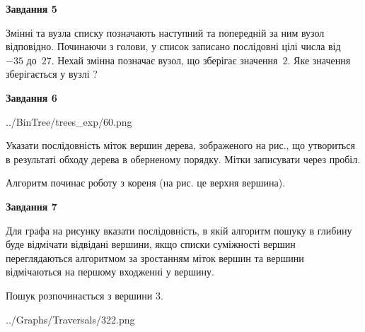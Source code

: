 \documentclass[12pt, ukrainian]{article}
\begin{document}
{\begin {large}
{\begin {center}\textbf{Завдання 5}\end {center}}\par
Змінні  та  вузла списку позначають наступний та попередній за ним вузол відповідно. Починаючи з голови, у список записано послідовні цілі числа від~$-35$ до~$27$. Нехай змінна  позначає вузол, що зберігає значення~$2$.
Яке значення зберігається у вузлі  ?\par
\newpage

{\begin {center}\textbf{Завдання 6}\end {center}}\par

\begin{center}
	{../BinTree/trees_exp/60.png}
\end{center}
Указати послідовність міток вершин дерева, зображеного на рис., що утвориться в результаті обходу дерева в оберненому порядку. Мітки записувати через пробіл.\par Алгоритм починає роботу з кореня (на рис. це верхня вершина).\par
\newpage

{\begin {center}\textbf{Завдання 7}\end {center}}\par
Для графа на рисунку вказати послідовність, в якій алгоритм пошуку в глибину буде відмічати відвідані вершини, якщо списки суміжності вершин переглядаються алгоритмом за зростанням міток вершин та вершини відмічаються на першому вход\-женні у вершину.\par
Пошук розпочинається з вершини 3.\par

\begin{center}
	{../Graphs/Traversals/322.png}
\end{center}\par
\newpage


\end{large}}
\end{document}
